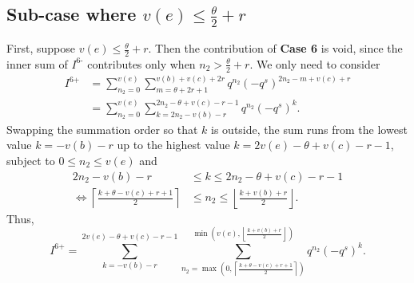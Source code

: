 \subsection{Sub-case where $v(e) \le \frac{\theta}{2} + r$}
First, suppose $v(e) \le \frac{\theta}{2} + r$.
Then the contribution of \textbf{Case 6\ts{-}} is void,
since the inner sum of $I^{\text{6-}}$ contributes only when $n_2 > \frac{\theta}{2} + r$.
We only need to consider
\begin{align*}
  I^{\text{6+}}
  &= \sum_{n_2=0}^{v(e)} \sum_{m=\theta+2r+1}^{v(b)+v(c)+2r}
    q^{n_2} (-q^s)^{2n_2-m+v(c)+r} \\
  &= \sum_{n_2=0}^{v(e)} \sum_{k=2n_2-v(b)-r}^{2n_2-\theta+v(c)-r-1}
    q^{n_2} (-q^s)^k.
\end{align*}
Swapping the summation order so that $k$ is outside,
the sum runs from the lowest value $k = -v(b) - r$
up to the highest value $k = 2v(e) - \theta + v(c) - r - 1$,
subject to $0 \le n_2 \le v(e)$ and
\begin{align*}
  2n_2 - v(b) - r &\le k \le 2n_2 - \theta + v(c) - r - 1 \\
  \iff \left\lceil \frac{k + \theta - v(c) + r + 1}{2} \right\rceil
  &\le n_2 \le \left\lfloor \frac{k + v(b) + r}{2} \right\rfloor.
\end{align*}
Thus,
\[ I^{\text{6+}}
  = \sum_{k = -v(b) - r}^{2v(e) - \theta + v(c) - r -1}
    \sum_{n_2 = \max(0, \left\lceil \frac{k + \theta - v(c) + r + 1}{2} \right\rceil)}
    ^{\min(v(e), \left\lfloor \frac{k + v(b) + r}{2} \right\rfloor)}
    q^{n_2} (-q^s)^k.
\]

